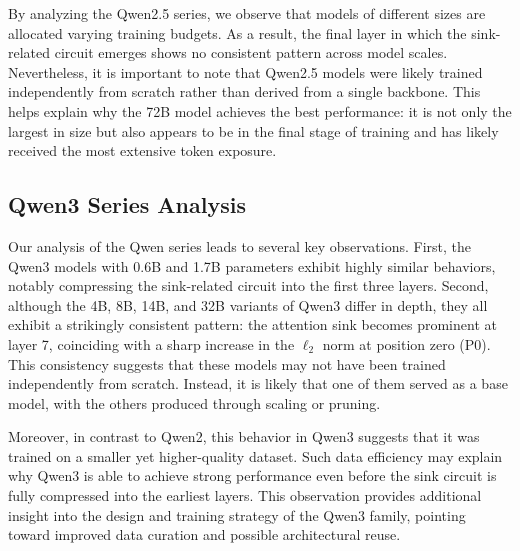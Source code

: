 \documentclass[]{template}
\theoremstyle{plain}
\theoremstyle{definition}
\theoremstyle{remark}
\begin{document}
By analyzing the Qwen2.5 series, we observe that models of different sizes are allocated varying training budgets. As a result, the final layer in which the sink-related circuit emerges shows no consistent pattern across model scales. Nevertheless, it is important to note that Qwen2.5 models were likely trained independently from scratch rather than derived from a single backbone. This helps explain why the 72B model achieves the best performance: it is not only the largest in size but also appears to be in the final stage of training and has likely received the most extensive token exposure.








\FloatBarrier

\newpage

\subsection{Qwen3 Series Analysis}

Our analysis of the Qwen series leads to several key observations. First, the Qwen3 models with 0.6B and 1.7B parameters exhibit highly similar behaviors, notably compressing the sink-related circuit into the first three layers. Second, although the 4B, 8B, 14B, and 32B variants of Qwen3 differ in depth, they all exhibit a strikingly consistent pattern: the attention sink becomes prominent at layer 7, coinciding with a sharp increase in the $\ell_2$ norm at position zero (P0). This consistency suggests that these models may not have been trained independently from scratch. Instead, it is likely that one of them served as a base model, with the others produced through scaling or pruning.

Moreover, in contrast to Qwen2, this behavior in Qwen3 suggests that it was trained on a smaller yet higher-quality dataset. Such data efficiency may explain why Qwen3 is able to achieve strong performance even before the sink circuit is fully compressed into the earliest layers. This observation provides additional insight into the design and training strategy of the Qwen3 family, pointing toward improved data curation and possible architectural reuse.
\end{document}
